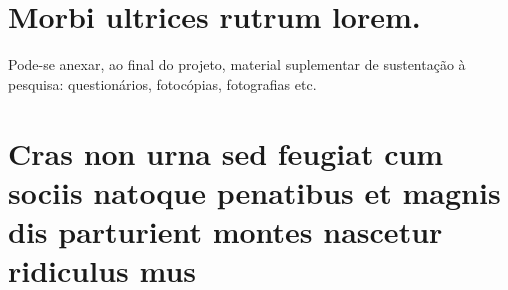\documentclass[12pt, oneside, a4paper, chapter=TITLE,section=TITLE]{abntex2}
\begin{document}
\begin{anexosenv} %

\partanexos %

\chapter{Morbi ultrices rutrum lorem.}
Pode-se anexar, ao final do projeto, material suplementar de sustentação à pesquisa: questionários, fotocópias, fotografias etc.

\lipsum[30]

\chapter{Cras non urna sed feugiat cum sociis natoque penatibus et magnis dis parturient montes nascetur ridiculus mus}

\lipsum[31]

\end{anexosenv} %

\printindex
\end{document}

